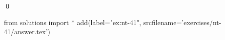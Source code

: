 
\begin{ex} 
  \label{ex:nt-41}
  
  \qed
\end{ex} 
\begin{python0}
from solutions import *
add(label="ex:nt-41",
    srcfilename='exercises/nt-41/answer.tex') 
\end{python0}

